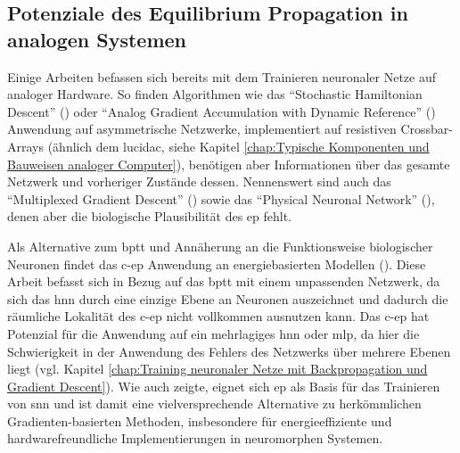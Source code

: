 \subsection{Potenziale des Equilibrium Propagation in analogen Systemen}
\label{chap:Potenziale des Equilibrium Propagation in analogen Systemen}

Einige Arbeiten befassen sich bereits mit dem Trainieren neuronaler Netze auf analoger Hardware. So finden Algorithmen wie das "`Stochastic Hamiltonian Descent"' (\cite{Onen2022}) oder "`Analog Gradient Accumulation with Dynamic Reference"' (\cite{Rasch2024}) Anwendung auf asymmetrische Netzwerke, implementiert auf resistiven Crossbar-Arrays (ähnlich \zb dem lucidac, siehe Kapitel \ref{chap:Typische Komponenten und Bauweisen analoger Computer}), benötigen aber Informationen über das gesamte Netzwerk und vorheriger Zustände dessen. Nennenswert sind auch das "`Multiplexed Gradient Descent"' (\cite{McCaughan2023}) sowie das "`Physical Neuronal Network"' (\cite{Sakemi2024}), denen aber die biologische Plausibilität des \ac{ep} fehlt.

Als Alternative zum \ac{bptt} und Annäherung an die Funktionsweise biologischer Neuronen findet das \ac{c-ep} Anwendung an energiebasierten Modellen (\cite{Ernoult2020}). Diese Arbeit befasst sich in Bezug auf das \ac{bptt} mit einem unpassenden Netzwerk, da sich das \ac{hnn} durch eine einzige Ebene an Neuronen auszeichnet und dadurch die räumliche Lokalität des \ac{c-ep} nicht vollkommen ausnutzen kann. Das \ac{c-ep} hat Potenzial für die Anwendung auf ein mehrlagiges \ac{hnn} oder \ac{mlp}, da hier die Schwierigkeit in der Anwendung des Fehlers des Netzwerks über mehrere Ebenen liegt (vgl. Kapitel \ref{chap:Training neuronaler Netze mit Backpropagation und Gradient Descent}). Wie \cite{Martin2020} auch zeigte, eignet sich \ac{ep} als Basis für das Trainieren von \ac{snn} und ist damit eine vielversprechende Alternative zu herkömmlichen Gradienten-basierten Methoden, insbesondere für energieeffiziente und hardwarefreundliche Implementierungen in neuromorphen Systemen.
